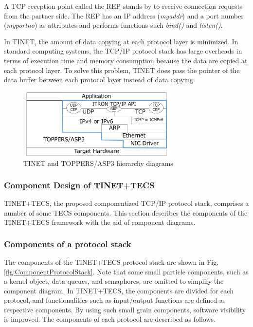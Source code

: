 \documentclass[JIP]{ipsj_v2/UTF8/ipsj}
\begin{document}
A TCP reception point called the REP stands by to receive connection requests from the partner side.
The REP has an IP address ({\it myaddr}) and a port number ({\it myportno}) as attributes and performs functions such {\it bind()} and {\it listen()}.

In TINET, the amount of data copying at each protocol layer is minimized.
In standard computing systems, the TCP/IP protocol stack has large overheads in terms of execution time and memory consumption because the data are copied at each protocol layer.
To solve this problem, TINET does pass the pointer of the data buffer between each protocol layer instead of data copying.

\begin{figure}[t]
    \centering
    \includegraphics[width=8cm,clip]{figure/TINETHierarchyDiagram.pdf}
    \caption{TINET and TOPPERS/ASP3 hierarchy diagrams}
    \label{fig:TINETHierarchyDiagram}
\end{figure}

\subsubsection{Component Design of TINET+TECS}

TINET+TECS, the proposed componentized TCP/IP protocol stack, comprises a number of some TECS components.
This section describes the components of the TINET+TECS framework with the aid of component diagrams.

\subsubsection*{Components of a protocol stack}

The components of the TINET+TECS protocol stack are shown in Fig.\ref{fig:ComponentProtocolStack}.
Note that some small particle components, such as a kernel object, data queues, and semaphores, are omitted to simplify the component diagram.
In TINET+TECS, the components are divided for each protocol, and functionalities such as input/output functions are defined as respective components.
By using such small grain components, software visibility is improved.
The components of each protocol are described as follows.
\end{document}
